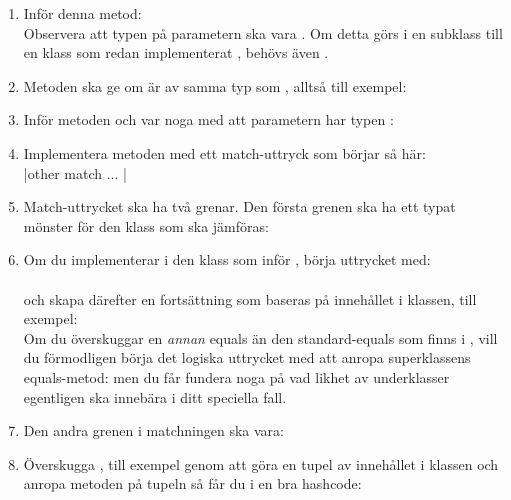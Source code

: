 \begin{enumerate}[leftmargin=*]
\item Inför denna metod: \\Observera att typen på parametern ska vara . Om detta görs i en subklass till en klass som redan implementerat , behövs även .

\item Metoden  ska ge  om  är av samma typ som , alltså till exempel: \\

\item Inför metoden  och var noga med att parametern har typen : \\ 

\item Implementera metoden  med ett match-uttryck som börjar så här: \\
\code|other match { ... } |

\item Match-uttrycket ska ha två grenar. Den första grenen ska ha ett typat mönster för den klass som ska jämföras: \\ 

\item Om du implementerar  i den klass som inför , börja uttrycket med: \\  \\
och skapa därefter en fortsättning som baseras på innehållet i klassen, till exempel:  \\
Om du överskuggar en \textit{annan} equals än den standard-equals som finns i , vill du förmodligen börja det logiska uttrycket med att anropa superklassens equals-metod:
  men du får fundera noga på vad likhet av underklasser egentligen ska innebära i ditt speciella fall.

\item Den andra grenen i matchningen ska vara:

\item Överskugga , till exempel genom att göra en tupel av innehållet i klassen och anropa metoden \code{##} på tupeln så får du i en bra hashcode: \\

\end{enumerate}


